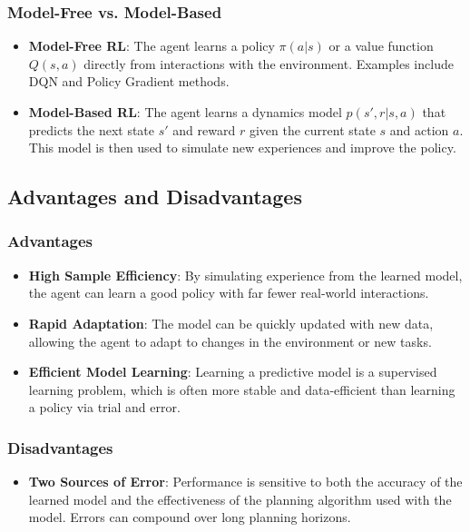 \documentclass[12pt]{article}
\begin{document}
\subsubsection{Model-Free vs. Model-Based}
\begin{itemize}
    \item \textbf{Model-Free RL}: The agent learns a policy $\pi(a|s)$ or a value function $Q(s,a)$ directly from interactions with the environment. Examples include DQN and Policy Gradient methods.
    \item \textbf{Model-Based RL}: The agent learns a dynamics model $p(s', r|s, a)$ that predicts the next state $s'$ and reward $r$ given the current state $s$ and action $a$. This model is then used to simulate new experiences and improve the policy.
\end{itemize}

\subsection{Advantages and Disadvantages}
\subsubsection{Advantages}
\begin{itemize}
    \item \textbf{High Sample Efficiency}: By simulating experience from the learned model, the agent can learn a good policy with far fewer real-world interactions.
    \item \textbf{Rapid Adaptation}: The model can be quickly updated with new data, allowing the agent to adapt to changes in the environment or new tasks.
    \item \textbf{Efficient Model Learning}: Learning a predictive model is a supervised learning problem, which is often more stable and data-efficient than learning a policy via trial and error.
\end{itemize}

\subsubsection{Disadvantages}
\begin{itemize}
    \item \textbf{Two Sources of Error}: Performance is sensitive to both the accuracy of the learned model and the effectiveness of the planning algorithm used with the model. Errors can compound over long planning horizons.
\end{itemize}
\end{document}

